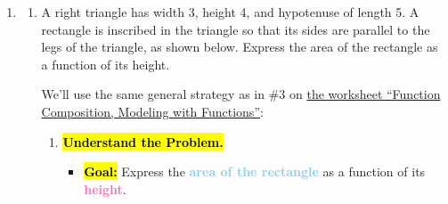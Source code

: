 \documentclass{article}
\newenvironment{noanswer}{}{}
\newcommand{\goal}[1]{\textbf{\textcolor{skyblue}{#1}}}
\newcommand{\indvar}[1]{\textbf{\textcolor{hotpink}{#1}}}
\theoremstyle{theorem}
\begin{document}
\begin{enumerate}
\begin{enumerate}
    \pspace{\vfill} 
    \begin{problemonly}
      \begin{center}
      \end{center}
    \end{problemonly}
  \end{enumerate}

  \pspace{\newpage} 

\item \label{rectangle-inscribed-in-triangle}  \finishexam 

  \begin{enumerate}
  \item \label{rectangle-inscribed-in-triangle-function} 
    \begin{problem}[\vfill]
      A right triangle has width 3, height 4, and hypotenuse of length 5. A rectangle is inscribed in the triangle so that its sides are parallel to the legs of the triangle, as shown below. Express the area of the rectangle as a function of its height.

    \end{problem}

    \begin{solution}
      We'll use the same general strategy as in {{\#3}} on \href{https://people.math.harvard.edu/~jjchen/mathma/docs/worksheets/worksheet06-sols.html}{the worksheet ``Function Composition, Modeling with Functions''}: 

      \begin{noanswer}
        \begin{enumerate}[label=\arabic*.]
        \item \hl{\textbf{Understand the Problem.}}

          \begin{itemize}
          \item \hl{\textbf{Goal:}} Express the \goal{area of the rectangle} as a function of its \indvar{height}.


\end{itemize}
\end{enumerate}
\end{noanswer}
\end{solution}
\end{enumerate}
\end{enumerate}
\end{document}
